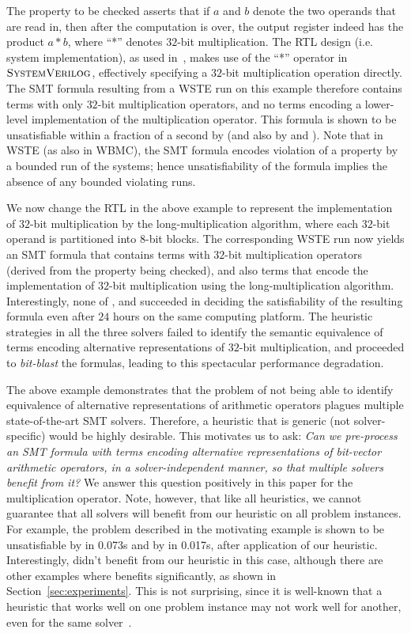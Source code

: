 The property to be checked asserts that if $a$ and $b$ denote the two
operands that are read in, then after the computation is over, the
output register indeed has the product $a * b$, where ``*'' denotes
$32$-bit multiplication.  The RTL design (i.e. system implementation),
as used in~\cite{wste}, makes use of the ``*'' operator in
$\textsc{SystemVerilog}$, effectively specifying a $32$-bit multiplication
operation directly.  The SMT formula resulting from a WSTE run on this
example therefore contains terms with only $32$-bit multiplication
operators, and no terms encoding a lower-level implementation of the
multiplication operator.  This formula is shown to be unsatisfiable
within a fraction of a second by {\boolector} (and also by {\cvcfour}
and {\zthree}).  Note that in WSTE (as also in WBMC), the SMT formula
encodes violation of a property by a bounded run of the systems; hence
unsatisfiability of the formula implies the absence of any bounded
violating runs.

We now change the RTL in the above example to represent the
implementation of $32$-bit multiplication by the long-multiplication
algorithm, where each $32$-bit operand is partitioned into $8$-bit
blocks.  The corresponding WSTE run now yields an SMT formula that
contains terms with $32$-bit multiplication operators (derived from
the property being checked), and also terms that encode the
implementation of $32$-bit multiplication using the
long-multiplication algorithm.  Interestingly, none of {\boolector},
{\cvcfour} and {\zthree} succeeded in deciding the satisfiability of
the resulting formula even after $24$ hours on the same computing
platform.  The heuristic strategies in all the three solvers failed to
identify the semantic equivalence of terms encoding alternative
representations of $32$-bit multiplication, and proceeded
to \emph{bit-blast} the formulas, leading to this spectacular
performance degradation.

The above example demonstrates that the problem of not being able to
identify equivalence of alternative representations of arithmetic
operators plagues multiple state-of-the-art SMT solvers.  Therefore, a
heuristic that is generic (not solver-specific) would be highly
desirable.  This motivates us to ask: \emph{Can we pre-process an SMT
formula with terms encoding alternative representations of bit-vector
arithmetic operators, in a solver-independent manner, so that multiple
solvers benefit from it?}  We answer this question positively in this
paper for the multiplication operator.  Note, however, that like all
heuristics, we cannot guarantee that all solvers will benefit from our
heuristic on all problem instances.  For example, the problem
described in the motivating example is shown to be unsatisfiable by
{\zthree} in 0.073s and by {\cvcfour} in 0.017s, after application of
our heuristic. Interestingly, {\boolector} didn't benefit from our
heuristic in this case, although there are other examples where
{\boolector} benefits significantly, as shown in
Section~\ref{sec:experiments}.  This is not surprising, since it is
well-known that a heuristic that works well on one problem instance
may not work well for another, even for the same
solver~\cite{deMoura2013}.

